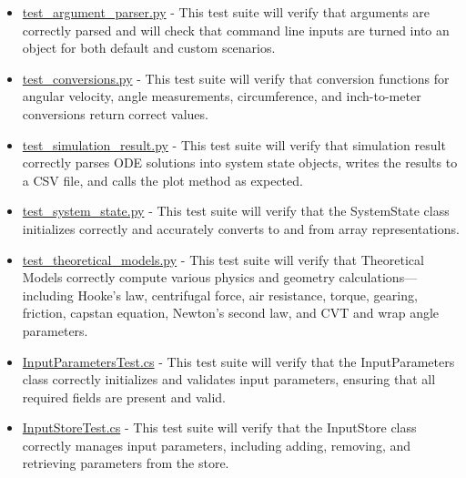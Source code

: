 \documentclass[12pt, titlepage]{article}
\begin{document}
\begin{itemize}
  \item \href{https://github.com/gr812b/CVT-Simulator/blob/main/test/utils/test_argument_parser.py}{test\_argument\_parser.py}
  \label{test:argument_parser} - This test suite will verify that arguments are correctly parsed and will check that command line inputs are turned into an object for both default and custom scenarios.

  \item \href{https://github.com/gr812b/CVT-Simulator/blob/main/test/utils/test_conversions.py}{test\_conversions.py}
  \label{test:conversions} - This test suite will verify that conversion functions for angular velocity, angle measurements, circumference, and inch-to-meter conversions return correct values.

  \item \href{https://github.com/gr812b/CVT-Simulator/blob/main/test/utils/test_simulation_result.py}{test\_simulation\_result.py}
  \label{test:simulation_result} - This test suite will verify that simulation result correctly parses ODE solutions into system state objects, writes the results to a CSV file, and calls the plot method as expected.

  \item \href{https://github.com/gr812b/CVT-Simulator/blob/main/test/utils/test_system_state.py}{test\_system\_state.py}
  \label{test:system_state} - This test suite will verify that the SystemState class initializes correctly and accurately converts to and from array representations.

  \item \href{https://github.com/gr812b/CVT-Simulator/blob/main/test/utils/test_theoretical_models.py}{test\_theoretical\_models.py}
  \label{test:theoretical_models} - This test suite will verify that Theoretical Models correctly compute various physics and geometry calculations—including Hooke’s law, centrifugal force, air resistance, torque, gearing, friction, capstan equation, Newton’s second law, and CVT and wrap angle parameters.

  \item \href{https://github.com/gr812b/CVT-Simulator/blob/main/src/frontend/CommunicationProtocolUnitTesting/InputParametersTest.cs}{InputParametersTest.cs}
  \label{test:InputParametersTest} - This test suite will verify that the InputParameters class correctly initializes and validates input parameters, ensuring that all required fields are present and valid.

  \item \href{https://github.com/gr812b/CVT-Simulator/blob/main/src/frontend/CommunicationProtocolUnitTesting/InputStoreTest.cs}{InputStoreTest.cs}
  \label{test:InputStoreTest} - This test suite will verify that the InputStore class correctly manages input parameters, including adding, removing, and retrieving parameters from the store.
  

\end{itemize}
\end{document}
